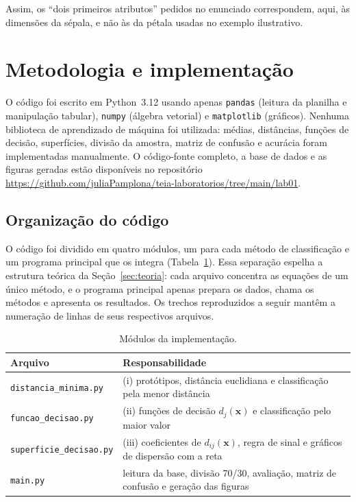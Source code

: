 \documentclass[12pt,a4paper]{article}
\newcommand{\repositorio}{\url{https://github.com/juliaPamplona/teia-laboratorios/tree/main/lab01}}
\begin{document}
Assim, os ``dois primeiros atributos'' pedidos no enunciado correspondem, aqui, às dimensões da sépala, e não às da pétala usadas no exemplo ilustrativo.

\section{Metodologia e implementação}

O código foi escrito em Python~3.12 usando apenas \texttt{pandas} (leitura da planilha e manipulação tabular), \texttt{numpy} (álgebra vetorial) e \texttt{matplotlib} (gráficos). Nenhuma biblioteca de aprendizado de máquina foi utilizada: médias, distâncias, funções de decisão, superfícies, divisão da amostra, matriz de confusão e acurácia foram implementadas manualmente. O código-fonte completo, a base de dados e as figuras geradas estão disponíveis no repositório \repositorio.

\subsection{Organização do código}

O código foi dividido em quatro módulos, um para cada método de classificação e um programa principal que os integra (Tabela~\ref{tab:modulos}). Essa separação espelha a estrutura teórica da Seção~\ref{sec:teoria}: cada arquivo concentra as equações de um único método, e o programa principal apenas prepara os dados, chama os métodos e apresenta os resultados. Os trechos reproduzidos a seguir mantêm a numeração de linhas de seus respectivos arquivos.

\begin{table}[H]
\centering
\caption{Módulos da implementação.}
\label{tab:modulos}
\begin{tabular}{lp{9.5cm}}
\toprule
Arquivo & Responsabilidade \\
\midrule
\texttt{distancia\_minima.py}   & (i) protótipos, distância euclidiana e classificação pela menor distância \\
\texttt{funcao\_decisao.py}     & (ii) funções de decisão $d_j(\mathbf{x})$ e classificação pelo maior valor \\
\texttt{superficie\_decisao.py} & (iii) coeficientes de $d_{ij}(\mathbf{x})$, regra de sinal e gráficos de dispersão com a reta \\
\texttt{main.py}                & leitura da base, divisão 70/30, avaliação, matriz de confusão e geração das figuras \\
\bottomrule
\end{tabular}
\end{table}
\end{document}
